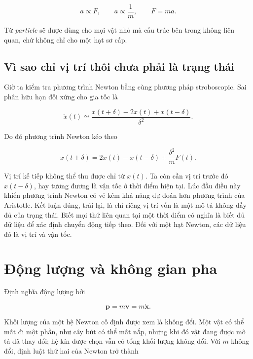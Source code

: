 \begin{equation}
  a\propto F,
  \qquad
  a\propto\frac{1}{m},
  \qquad
  F=ma.
  \label{eq:force-mass-scaling}
\end{equation}

Từ \emph{particle} sẽ được dùng cho mọi vật nhỏ mà cấu trúc bên trong không liên quan, chứ không chỉ cho một hạt sơ cấp.

\subsection{Vì sao chỉ vị trí thôi chưa phải là trạng thái}

Giờ ta kiểm tra phương trình Newton bằng cùng phương pháp stroboscopic. Sai phân hữu hạn đối xứng cho gia tốc là

\begin{equation}
  \ddot x(t)\simeq
  \frac{x(t+\delta)-2x(t)+x(t-\delta)}{\delta^2}.
  \label{eq:second-difference}
\end{equation}

Do đó phương trình Newton kéo theo

\begin{equation}
  x(t+\delta)
  =2x(t)-x(t-\delta)+\frac{\delta^2}{m}F(t).
  \label{eq:newton-position-update}
\end{equation}

Vị trí kế tiếp không thể thu được chỉ từ \(x(t)\). Ta còn cần vị trí trước đó \(x(t-\delta)\), hay tương đương là vận tốc ở thời điểm hiện tại. Lúc đầu điều này khiến phương trình Newton có vẻ kém khả năng dự đoán hơn phương trình của Aristotle. Kết luận đúng, trái lại, là chỉ riêng vị trí vốn là một mô tả không đầy đủ của trạng thái. Biết mọi thứ liên quan tại một thời điểm có nghĩa là biết đủ dữ liệu để xác định chuyển động tiếp theo. Đối với một hạt Newton, các dữ liệu đó là vị trí và vận tốc.

\section{Động lượng và không gian pha}

Định nghĩa động lượng bởi

\begin{equation}
  \mathbf p=m\mathbf v=m\dot{\mathbf x}.
  \label{eq:momentum-definition}
\end{equation}

Khối lượng của một hệ Newton cố định được xem là không đổi. Một vật có thể mất đi một phần, như cây bút có thể mất nắp, nhưng khi đó vật đang được mô tả đã thay đổi; hệ kín được chọn vẫn có tổng khối lượng không đổi. Với \(m\) không đổi, định luật thứ hai của Newton trở thành

